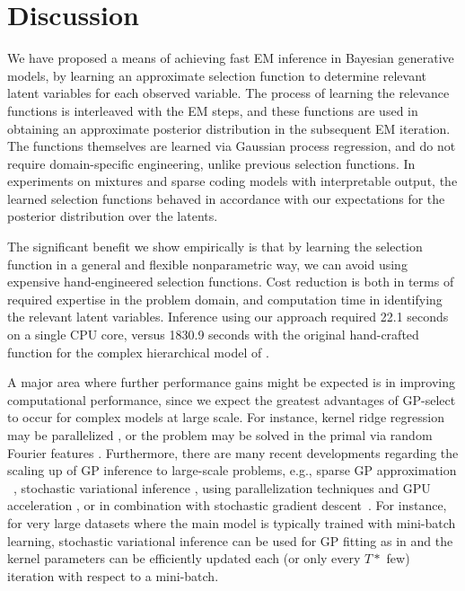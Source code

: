 \section{Discussion}
\label{disc}
%
We have proposed a means of achieving fast EM inference in Bayesian generative models, by
learning an approximate selection function to determine relevant latent variables
for each observed variable. The process of learning the relevance functions
is interleaved with the EM steps, and these functions
are used in obtaining an approximate posterior distribution in the subsequent EM iteration.
The functions themselves are learned via Gaussian process regression,
and do not require domain-specific engineering, unlike previous selection functions.
In experiments on mixtures and sparse coding models with interpretable output,
the learned selection functions behaved in accordance with our expectations for the posterior
distribution over the latents.  

The significant benefit we show empirically is that by learning the selection function in a general and flexible nonparametric way, we can avoid using expensive hand-engineered selection functions.
Cost reduction is both in terms of required expertise in the problem domain, and computation time in identifying the relevant latent variables.
Inference using our approach required 22.1 seconds on a single CPU core, versus  1830.9 seconds with the original hand-crafted function 
for the complex hierarchical model of \citep{DaiEtAl2013}.

A major area where further performance gains might be expected is in
improving computational performance, since we expect the greatest
advantages of GP-select to occur for complex models at large scale. For instance,
 kernel ridge regression may be parallelized \citep{zhang14divide},
or the problem may be solved in the primal via random Fourier features \citep{LeSarSmo13}.
Furthermore, there are many recent developments regarding the scaling up of GP inference to large-scale problems, e.g., sparse GP approximation
~\citep{sparseGP}, stochastic variational inference \citep{HensmanEtAl2013,Hensman2012}, using parallelization techniques and GPU acceleration \citep{DaiEtAl2014}, or in combination with stochastic gradient descent~\citep{Bottou08thetradeoffs}. 
For instance, for very large datasets where the main model is typically trained with mini-batch learning, stochastic variational inference can be used for GP fitting as in \citep{HensmanEtAl2013} and the kernel parameters can be efficiently updated each (or only every $T*$ few) iteration with respect to a mini-batch.



